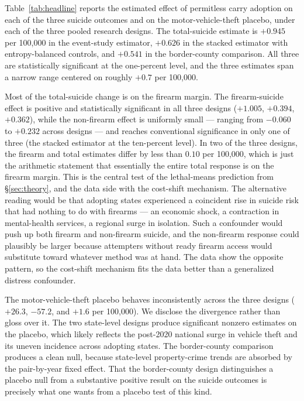 \documentclass[12pt]{article}
\begin{document}
Table~\ref{tab:headline} reports the estimated effect of permitless
carry adoption on each of the three suicide outcomes and on the
motor-vehicle-theft placebo, under each of the three pooled
research designs. The total-suicide estimate is $+0.945$ per
100,000 in the event-study estimator, $+0.626$ in the stacked
estimator with entropy-balanced controls, and $+0.541$ in the
border-county comparison. All three are statistically significant
at the one-percent level, and the three estimates span a narrow
range centered on roughly $+0.7$ per 100,000.


Most of the total-suicide change is on the firearm margin. The
firearm-suicide effect is positive and statistically significant in
all three designs ($+1.005$, $+0.394$, $+0.362$), while the
non-firearm effect is uniformly small --- ranging from $-0.060$ to
$+0.232$ across designs --- and reaches conventional significance
in only one of three (the stacked estimator at the ten-percent
level). In two of the three designs, the firearm and total
estimates differ by less than $0.10$ per 100,000, which is just
the arithmetic statement that essentially the entire total
response is on the firearm margin. This is the central test of
the lethal-means prediction from §\ref{sec:theory}, and the data
side with the cost-shift mechanism. The alternative reading would
be that adopting states experienced a coincident rise in suicide
risk that had nothing to do with firearms ---
an economic shock, a contraction in mental-health services, a
regional surge in isolation. Such a confounder would push up both
firearm and non-firearm suicide, and the non-firearm response
could plausibly be larger because attempters without ready
firearm access would substitute toward whatever method was at
hand. The data show the opposite pattern, so the cost-shift
mechanism fits the data better than a generalized distress
confounder.

The motor-vehicle-theft placebo behaves inconsistently across the
three designs ($+26.3$, $-57.2$, and $+1.6$ per 100,000). We
disclose the divergence rather than gloss over it. The two
state-level designs produce significant nonzero estimates on the
placebo, which likely reflects the post-2020 national surge in
vehicle theft and its uneven incidence across adopting states. The
border-county comparison produces a clean null, because state-level
property-crime trends are absorbed by the pair-by-year fixed effect.
That the border-county design distinguishes a placebo null from a
substantive positive result on the suicide outcomes is precisely
what one wants from a placebo test of this kind.
\end{document}
